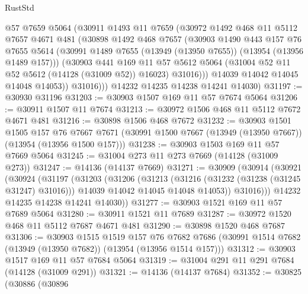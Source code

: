 \begin{lexlean}{RustStd}
\begin{coremodule}
            @57
            @7659
            @5064
            (@30911
              @1493
              @11
              @7659
              (@30972
                @1492
                @468
                @11
                @5112
                @7657
                @4671
                @481
                (@30898
                  @1492
                  @468
                  @7657
                  (@30903
                    @1490
                    @443
                    @157
                    @76
                    @7655
                    @5614
                    (@30991 @1489 @7655 (@13949 (@13950 @7655)) (@13954 (@13956 @1489 @157)))
                    (@30903
                      @441
                      @169
                      @11
                      @57
                      @5612
                      @5064
                      (@31004 @52 @11 @52 @5612 (@14128 (@31009 @52)) @16023)
                      @31016)))
                @14039
                @14042
                @14045
                @14048
                @14053))
            @31016)))
      @14232
      @14235
      @14238
      @14241
      @14030)
@31197 := @30930 @31196
@31203 := @30903 @1507 @169 @11 @57 @7674 @5064
@31206 := @30911 @1507 @11 @7674
@31213 := @30972 @1506 @468 @11 @5112 @7672 @4671 @481
@31216 := @30898 @1506 @468 @7672
@31232 := @30903
    @1501
    @1505
    @157
    @76
    @7667
    @7671
    (@30991 @1500 @7667 (@13949 (@13950 @7667)) (@13954 (@13956 @1500 @157)))
@31238 := @30903 @1503 @169 @11 @57 @7669 @5064
@31245 := @31004 @273 @11 @273 @7669 (@14128 (@31009 @273))
@31247 := @14136 (@14137 @7669)
@31271 := @30909
    (@30914
      (@30921
        (@30924
          (@31197
            (@31203
              (@31206
                (@31213
                  (@31216 (@31232 (@31238 (@31245 @31247) @31016)))
                  @14039
                  @14042
                  @14045
                  @14048
                  @14053))
              @31016)))
        @14232
        @14235
        @14238
        @14241
        @14030))
@31277 := @30903 @1521 @169 @11 @57 @7689 @5064
@31280 := @30911 @1521 @11 @7689
@31287 := @30972 @1520 @468 @11 @5112 @7687 @4671 @481
@31290 := @30898 @1520 @468 @7687
@31306 := @30903
    @1515
    @1519
    @157
    @76
    @7682
    @7686
    (@30991 @1514 @7682 (@13949 (@13950 @7682)) (@13954 (@13956 @1514 @157)))
@31312 := @30903 @1517 @169 @11 @57 @7684 @5064
@31319 := @31004 @291 @11 @291 @7684 (@14128 (@31009 @291))
@31321 := @14136 (@14137 @7684)
@31352 := @30825
    (@30886
      (@30896

\end{coremodule}
\end{lexlean}
